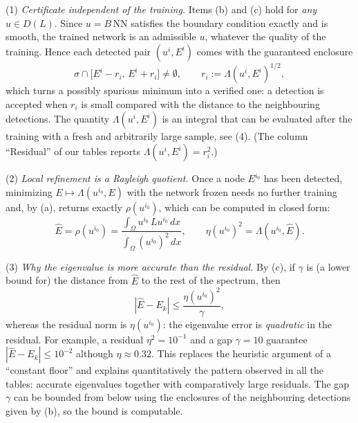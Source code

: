 \begin{remark}\label{rem.certificate}
(1) \emph{Certificate independent of the training.} Items (b) and (c) hold for
\emph{any} $u\in D(L)$. Since $u=B\,\mathrm{NN}$ satisfies the boundary condition exactly
and is smooth, the trained network is an admissible $u$, whatever the quality of the
training. Hence each detected pair $(u^i,E^i)$ comes with the guaranteed enclosure
\[
\sigma\cap\big[E^i-r_i,\,E^i+r_i\big]\neq\emptyset,\qquad r_i:=\Lambda(u^i,E^i)^{1/2},
\]
which turns a possibly spurious minimum into a verified one: a detection is accepted
when $r_i$ is small compared with the distance to the neighbouring detections. The
quantity $\Lambda(u^i,E^i)$ is an integral that can be evaluated after the training with
a fresh and arbitrarily large sample, see (4). (The column ``Residual'' of our tables
reports $\Lambda(u^i,E^i)=r_i^2$.)

(2) \emph{Local refinement is a Rayleigh quotient.} Once a node $E^{i_0}$ has been
detected, minimizing $E\mapsto\Lambda(u^{i_0},E)$ with the network frozen needs no
further training and, by (a), returns exactly $\rho(u^{i_0})$, which can be computed in
closed form:
\[
\hat E=\rho(u^{i_0})=\frac{\int_\Omega u^{i_0}\,Lu^{i_0}\,dx}{\int_\Omega (u^{i_0})^2\,dx},
\qquad \eta(u^{i_0})^2=\Lambda(u^{i_0},\hat E).
\]

(3) \emph{Why the eigenvalue is more accurate than the residual.} By (c), if $\gamma$ is
(a lower bound for) the distance from $\hat E$ to the rest of the spectrum, then
\[
|\hat E-E_k|\le\frac{\eta(u^{i_0})^2}{\gamma},
\]
whereas the residual norm is $\eta(u^{i_0})$: the eigenvalue error is \emph{quadratic}
in the residual. For example, a residual $\eta^2=10^{-1}$ and a gap $\gamma=10$ guarantee
$|\hat E-E_k|\le10^{-2}$ although $\eta\approx0.32$. This replaces the heuristic argument
of a ``constant floor'' and explains quantitatively the pattern observed in all the
tables: accurate eigenvalues together with comparatively large residuals. The gap
$\gamma$ can be bounded from below using the enclosures of the neighbouring detections
given by (b), so the bound is computable.


\end{remark}
